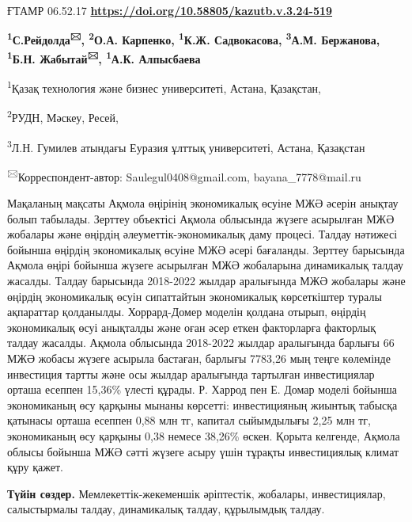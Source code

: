 \newpage
ҒТАМР 06.52.17
\hfill {\bfseries \href{https://doi.org/10.58805/kazutb.v.3.24-519}{https://doi.org/10.58805/kazutb.v.3.24-519}}


\begin{center}
{\bfseries \textsuperscript{1}С.Рейдолда\textsuperscript{🖂}, \textsuperscript{2}О.А. Карпенко, \textsuperscript{1}К.Ж. Садвокасова, \textsuperscript{3}А.М. Бержанова, \textsuperscript{1}Б.Н. Жабытай\textsuperscript{🖂}, \textsuperscript{1}А.К. Алпысбаева}

\textsuperscript{1}Қазақ технология және бизнес университеті, Астана,
Қазақстан,

\textsuperscript{2}РУДН, Мәскеу, Ресей,

\textsuperscript{3}Л.Н. Гумилев атындағы Еуразия ұлттық университеті,
Астана, Қазақстан
\end{center}

\textsuperscript{🖂}Корреспондент-автор: Saulegul0408@gmail.com, bayana\_7778@mail.ru

Мақаланың мақсаты Ақмола өңірінің экономикалық өсуіне МЖӘ әсерін анықтау
болып табылады. Зерттеу объектісі Ақмола облысында жүзеге асырылған МЖӘ
жобалары және өңірдің әлеуметтік-экономикалық даму процесі. Талдау
нәтижесі бойынша өңірдің экономикалық өсуіне МЖӘ әсері бағаланды.
Зерттеу барысында Ақмола өңірі бойынша жүзеге асырылған МЖӘ жобаларына
динамикалық талдау жасалды. Талдау барысында 2018-2022 жылдар аралығында
МЖӘ жобалары және өңірдің экономикалық өсуін сипаттайтын экономикалық
көрсеткіштер туралы ақпараттар қолданылды. Хоррард-Домер моделін қолдана
отырып, өңірдің экономикалық өсуі анықталды және оған әсер еткен
факторларға факторлық талдау жасалды. Ақмола облысында 2018-2022 жылдар
аралығында барлығы 66 МЖӘ жобасы жүзеге асырыла бастаған, барлығы
7783,26 мың теңге көлемінде инвестиция тартты және осы жылдар аралығында
тартылған инвестициялар орташа есеппен 15,36\% үлесті құрады. Р. Харрод
пен Е. Домар моделі бойынша экономиканың өсу қарқыны мынаны көрсетті:
инвестицияның жиынтық табысқа қатынасы орташа есеппен 0,88 млн тг,
капитал сыйымдылығы 2,25 млн тг, экономиканың өсу қарқыны 0,38 немесе
38,26\% өскен. Қорыта келгенде, Ақмола облысы бойынша МЖӘ сәтті жүзеге
асыру үшін тұрақты инвестициялық климат құру қажет.

{\bfseries Түйін сөздер.} Мемлекеттік-жекеменшік әріптестік, жобалары,
инвестициялар, салыстырмалы талдау, динамикалық талдау, құрылымдық
талдау.

